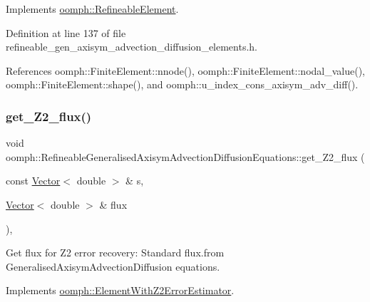Implements \hyperlink{classoomph_1_1RefineableElement_ada6f0efe831ffefb1d2829ce01d45bfc}{oomph\+::\+Refineable\+Element}.



Definition at line 137 of file refineable\+\_\+gen\+\_\+axisym\+\_\+advection\+\_\+diffusion\+\_\+elements.\+h.



References oomph\+::\+Finite\+Element\+::nnode(), oomph\+::\+Finite\+Element\+::nodal\+\_\+value(), oomph\+::\+Finite\+Element\+::shape(), and oomph\+::u\+\_\+index\+\_\+cons\+\_\+axisym\+\_\+adv\+\_\+diff().

\mbox{\label{classoomph_1_1RefineableGeneralisedAxisymAdvectionDiffusionEquations_a5573e05f0eb0cf349bbb3d396dc8fc7c}} 
\subsubsection{\texorpdfstring{get\+\_\+\+Z2\+\_\+flux()}{get\_Z2\_flux()}}
{\footnotesize\ttfamily void oomph\+::\+Refineable\+Generalised\+Axisym\+Advection\+Diffusion\+Equations\+::get\+\_\+\+Z2\+\_\+flux (\begin{DoxyParamCaption}\item[{const \hyperlink{classoomph_1_1Vector}{Vector}$<$ double $>$ \&}]{s,  }\item[{\hyperlink{classoomph_1_1Vector}{Vector}$<$ double $>$ \&}]{flux }\end{DoxyParamCaption})\hspace{0.3cm}{\ttfamily [inline]}, {\ttfamily [virtual]}}



Get \textquotesingle{}flux\textquotesingle{} for Z2 error recovery\+: Standard flux.\+from Generalised\+Axisym\+Advection\+Diffusion equations. 



Implements \hyperlink{classoomph_1_1ElementWithZ2ErrorEstimator_a5688ff5f546d81771cabad82ca5a7556}{oomph\+::\+Element\+With\+Z2\+Error\+Estimator}.



